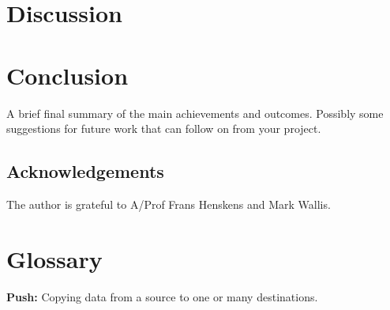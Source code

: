 \documentclass[a4,12pt]{article}
\begin{document}
\section{Discussion}\label{sec:discussion}
%
\section{Conclusion}
%
A brief final summary of the main achievements and outcomes. Possibly some suggestions for future work that can follow on from your project.%
%
\subsection*{Acknowledgements}
The author is grateful to A/Prof Frans Henskens and Mark Wallis.
\section{Glossary}
\textbf{Push:} Copying data from a source to one or many destinations. 
\textbf{ }
%

\vskip 0.2in


\end{document}
